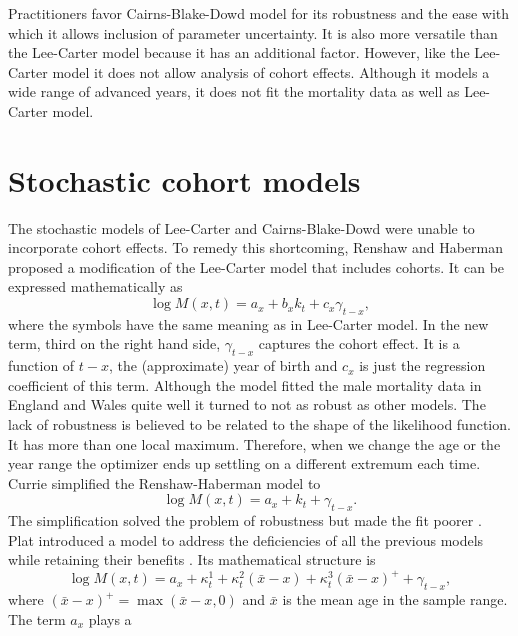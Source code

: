\documentclass{article}
\numberwithin{equation}{section}
\begin{document}
Practitioners favor Cairns-Blake-Dowd model for its robustness and the ease
with which it allows inclusion of parameter uncertainty. It is also more 
versatile than the Lee-Carter model because it has an additional factor. 
However, like the Lee-Carter model it does not allow analysis of cohort effects.
Although it models a wide range of advanced years, it does not fit the 
mortality data as well as Lee-Carter model.

\section{Stochastic cohort models}\label{s9}
The stochastic models of Lee-Carter and Cairns-Blake-Dowd were unable to
incorporate cohort effects. To remedy this shortcoming, Renshaw and Haberman
\cite{renshaw2006cohort} proposed a modification of the Lee-Carter model that 
includes cohorts. It can be expressed mathematically as
\begin{equation}\label{s9e1}
\log{M}(x, t) = {a}_x + {b}_x{k}_t + {c}_x\gamma_{t-x},
\end{equation}
where the symbols have the same meaning as in Lee-Carter model. In the new
term, third on the right hand side, $\gamma_{t-x}$ captures the cohort effect.
It is a function of $t - x$, the (approximate) year of birth and ${c}_x$
is just the regression coefficient of this term. Although the model fitted the
male mortality data in England and Wales quite well it turned to not as 
robust as other models. The lack of robustness is believed to be related to
the shape of the likelihood function. It has more than one local maximum.
Therefore, when we change the age or the year range the optimizer ends up
settling on a different extremum each time\cite{cairns2008modelling}. Currie
simplified the Renshaw-Haberman model to
\begin{equation}\label{s9e2}
\log{M}(x, t) = {a}_x + {k}_t + \gamma_{t-x}.
\end{equation}
The simplification solved the problem of robustness but made the fit poorer
\cite{plat2009stochastic}. Plat introduced a model to address the deficiencies
of all the previous models while retaining their benefits 
\cite{plat2009stochastic}. Its mathematical structure is
\begin{equation}\label{s9e3}
\log M(x,t) = a_x + \kappa^1_t + \kappa^2_t(\bar{x} - x) + 
\kappa^3_t(\bar{x} - x)^+ + \gamma_{t-x},
\end{equation}
where $(\bar{x} - x)^+ = \max(\bar{x} - x, 0)$ and $\bar{x}$ is the mean age
in the sample range. The term $a_x$ plays a 
\end{document}
